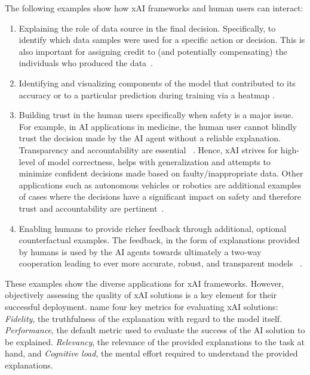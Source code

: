 \documentclass[twoside,11pt]{article}
\begin{document}
The following examples show how xAI frameworks and human users can interact:
\begin{enumerate}
\item Explaining the role of data source in the final decision. Specifically, to identify which data samples were used for a specific action or decision. This is also important for assigning credit to (and potentially compensating) the individuals who produced the data~\citep{zanzotto2019human}. 
\item Identifying and visualizing components of the model that contributed to its accuracy or to a particular prediction during training via a heatmap \citep{SturmEtAl:2015:InteractiveHeatmap}.
\item Building trust in the human users specifically when safety is a major issue. For example, in AI applications in medicine, the human user cannot blindly trust the decision made by the AI agent without a reliable explanation. Transparency and accountability are essential ~\citep{Schneeberger:2020:legalAI, Stoeger:2021:MedicalAI}. Hence, xAI strives for high-level of model correctness, helps with generalization and attempts to minimize confident decisions made based on faulty/inappropriate data. Other applications such as autonomous vehicles or robotics are additional examples of cases where the decisions have a significant impact on safety and therefore trust and accountability are pertinent~\citep{araiza2019safe, WellsBednarz:2021:xAIRLSurvey}.
\item Enabling humans to provide richer feedback through additional, optional counterfactual examples. The feedback, in the form of explanations provided by humans is used by the AI agents towards ultimately a two-way cooperation leading to ever more accurate, robust, and transparent models ~\citep{Karalus:2021:HITL-counterfactuals,PuiuttaVeith:2020:xAIRLSurvey}.   
\end{enumerate}

These examples show the diverse applications for xAI frameworks. However, objectively assessing the quality of xAI solutions is a key element for their successful deployment. \cite{milani2022survey} name four key metrics for evaluating xAI solutions: \emph{Fidelity}, the truthfulness of the explanation with regard to the model itself. \emph{Performance}, the default metric used to evaluate the success of the AI solution to be explained. \emph{Relevancy}, the relevance of the provided explanations to the task at hand, and \emph{Cognitive load}, the mental effort required to understand the provided explanations. \\
\end{document}
